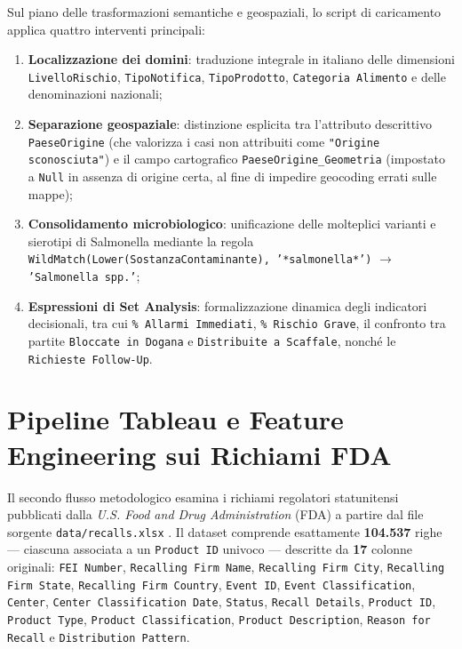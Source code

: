 Sul piano delle trasformazioni semantiche e geospaziali, lo script di caricamento applica quattro interventi principali:
\begin{enumerate}
    \item \textbf{Localizzazione dei domini}: traduzione integrale in italiano delle dimensioni \texttt{LivelloRischio}, \texttt{TipoNotifica}, \texttt{TipoProdotto}, \texttt{Categoria Alimento} e delle denominazioni nazionali;
    \item \textbf{Separazione geospaziale}: distinzione esplicita tra l'attributo descrittivo \texttt{PaeseOrigine} (che valorizza i casi non attribuiti come \texttt{"Origine sconosciuta"}) e il campo cartografico \texttt{PaeseOrigine\_Geometria} (impostato a \texttt{Null} in assenza di origine certa, al fine di impedire geocoding errati sulle mappe);
    \item \textbf{Consolidamento microbiologico}: unificazione delle molteplici varianti e sierotipi di Salmonella mediante la regola \texttt{WildMatch(Lower(\-SostanzaContaminante), '*salmonella*')} $\to$ \texttt{'Salmonella spp.'};
    \item \textbf{Espressioni di Set Analysis}: formalizzazione dinamica degli indicatori decisionali, tra cui \texttt{\% Allarmi Immediati}, \texttt{\% Rischio Grave}, il confronto tra partite \texttt{Bloccate in Dogana} e \texttt{Distribuite a Scaffale}, nonché le \texttt{Richieste Follow-Up}.
\end{enumerate}

\section{Pipeline Tableau e Feature Engineering sui Richiami FDA}
\label{sec:method_tableau}

Il secondo flusso metodologico esamina i richiami regolatori statunitensi pubblicati dalla \textit{U.S. Food and Drug Administration} (FDA) a partire dal file sorgente \texttt{data/recalls.xlsx} \citep{fda_recalls_portal,tableau_docs}. Il dataset comprende esattamente \textbf{104.537} righe --- ciascuna associata a un \texttt{Product ID} univoco --- descritte da \textbf{17} colonne originali: \texttt{FEI Number}, \texttt{Recalling Firm Name}, \texttt{Recalling Firm City}, \texttt{Recalling Firm State}, \texttt{Recalling Firm Country}, \texttt{Event ID}, \texttt{Event Classification}, \texttt{Center}, \texttt{Center Classification Date}, \texttt{Status}, \texttt{Recall Details}, \texttt{Product ID}, \texttt{Product Type}, \texttt{Product Classification}, \texttt{Product Description}, \texttt{Reason for Recall} e \texttt{Distribution Pattern}.

